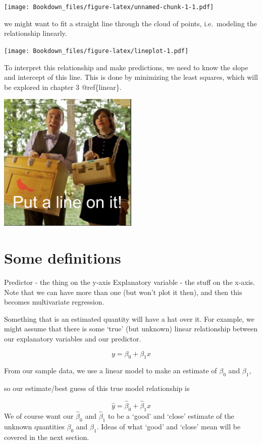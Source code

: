 \documentclass[
]{book}
\begin{document}
\texttt{[image: Bookdown\_files/figure-latex/unnamed-chunk-1-1.pdf]}

we might want to fit a straight line through the cloud of points, i.e.~modeling the relationship linearly.

\texttt{[image: Bookdown\_files/figure-latex/lineplot-1.pdf]}

To interpret this relationship and make predictions, we need to know the slope and intercept of this line. This is done by minimizing the least squares, which will be explored in chapter 3 @ref\{linear\}.

\includegraphics[width=0.5\textwidth,height=\textheight]{images/put_a_bird.png}

\hypertarget{some-definitions}{%
\section{Some definitions}\label{some-definitions}}

Predictor - the thing on the y-axis
Explanatory variable - the stuff on the x-axis. Note that we can have more than one (but won't plot it then), and then this becomes multivariate regression.

Something that is an estimated quantity will have a hat over it.
For example, we might assume that there is some `true' (but unknown) linear relationship between our explanatory variables and our predictor.

\[ y = \beta_0 + \beta_1 x\]

From our sample data, we use a linear model to make an estimate of \(\beta_0\) and \(\beta_1\),

so our estimate/best guess of this true model relationship is

\[ \hat y = \hat\beta_0 + \hat\beta_1 x\]
We of course want our \(\hat\beta_0\) and \(\hat\beta_1\) to be a `good' and `close' estimate of the unknown quantities \(\beta_0\) and \(\beta_1\). Ideas of what `good' and `close' mean will be covered in the next section.
\end{document}
